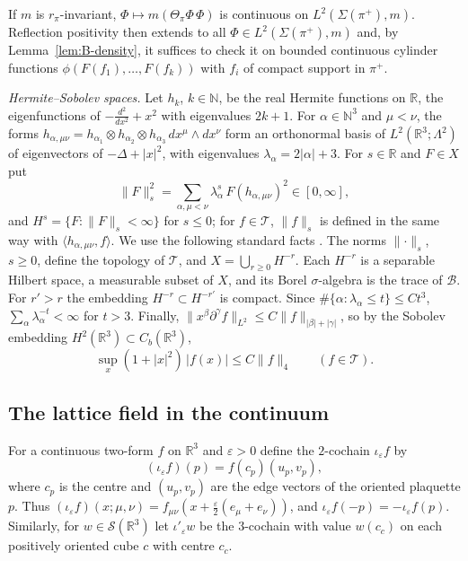 \documentclass[11pt]{amsart}
\theoremstyle{plain}
\theoremstyle{definition}
\theoremstyle{remark}
\numberwithin{equation}{section}
\newcommand{\R}{\mathbb{R}}
\newcommand{\N}{\mathbb{N}}
\newcommand{\eps}{\varepsilon}
\newcommand{\cB}{\mathcal{B}}
\newcommand{\cT}{\mathcal{T}}
\newcommand{\cS}{\mathcal{S}}
\newcommand{\abs}[1]{\lvert #1\rvert}
\newcommand{\norm}[1]{\lVert #1\rVert}
\newcommand{\ip}[2]{\langle #1,#2\rangle}
\begin{document}
If $m$ is $r_\pi$-invariant, $\Phi\mapsto m(\Theta_\pi\Phi\,\Phi)$ is continuous on $L^2(\Sigma(\pi^+),m)$. Reflection positivity then extends to all $\Phi\in L^2(\Sigma(\pi^+),m)$ and, by Lemma~\ref{lem:B-density}, it suffices to check it on bounded continuous cylinder functions $\phi(F(f_1),\dots,F(f_k))$ with $f_i$ of compact support in $\pi^+$.

\emph{Hermite--Sobolev spaces.} Let $h_k$, $k\in\N$, be the real Hermite functions on $\R$, the eigenfunctions of $-\frac{d^2}{dx^2}+x^2$ with eigenvalues $2k+1$. For $\alpha\in\N^3$ and $\mu<\nu$, the forms $h_{\alpha,\mu\nu}=h_{\alpha_1}\otimes h_{\alpha_2}\otimes h_{\alpha_3}\,dx^\mu\wedge dx^\nu$ form an orthonormal basis of $L^2(\R^3;\Lambda^2)$ of eigenvectors of $-\Delta+\abs x^2$, with eigenvalues $\lambda_\alpha=2\abs\alpha+3$. For $s\in\R$ and $F\in X$ put
\[
\norm F_{s}^2=\sum_{\alpha,\mu<\nu}\lambda_\alpha^{s}\,F(h_{\alpha,\mu\nu})^2\in[0,\infty],
\]
and $H^{s}=\{F:\norm F_s<\infty\}$ for $s\le0$; for $f\in\cT$, $\norm f_s$ is defined in the same way with $\ip{h_{\alpha,\mu\nu}}f$. We use the following standard facts \cite[Sect.~V.3]{RS}. The norms $\norm\cdot_s$, $s\ge0$, define the topology of $\cT$, and $X=\bigcup_{r\ge0}H^{-r}$. Each $H^{-r}$ is a separable Hilbert space, a measurable subset of $X$, and its Borel $\sigma$-algebra is the trace of $\cB$. For $r'>r$ the embedding $H^{-r}\subset H^{-r'}$ is compact. Since $\#\{\alpha:\lambda_\alpha\le t\}\le Ct^3$, $\sum_\alpha\lambda_\alpha^{-t}<\infty$ for $t>3$. Finally, $\norm{x^\beta\partial^\gamma f}_{L^2}\le C\norm f_{\abs\beta+\abs\gamma}$, so by the Sobolev embedding $H^2(\R^3)\subset C_b(\R^3)$,
\begin{equation}\label{eq:sobolev}
\sup_x(1+\abs x^2)\,\abs{f(x)}\le C\norm f_4\qquad(f\in\cT).
\end{equation}

\subsection{The lattice field in the continuum}\label{ssec:field}
For a continuous two-form $f$ on $\R^3$ and $\eps>0$ define the $2$-cochain $\iota_\eps f$ by
\[
(\iota_\eps f)(p)=f(c_p)(u_p,v_p),
\]
where $c_p$ is the centre and $(u_p,v_p)$ are the edge vectors of the oriented plaquette $p$. Thus $(\iota_\eps f)(x;\mu,\nu)=f_{\mu\nu}(x+\frac\eps2(e_\mu+e_\nu))$, and $\iota_\eps f(-p)=-\iota_\eps f(p)$. Similarly, for $w\in\cS(\R^3)$ let $\iota'_\eps w$ be the $3$-cochain with value $w(c_c)$ on each positively oriented cube $c$ with centre $c_c$.
\end{document}
